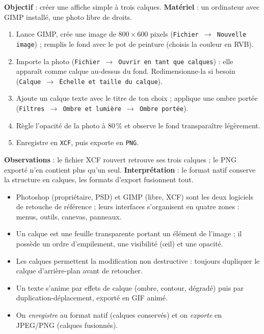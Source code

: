 \documentclass[11pt]{article}
\newcommand{\cle}[1]{{\popxbold\color{popdark}#1}}
\begin{document}
\begin{experience}
\textbf{Objectif} : créer une affiche simple à trois calques. \textbf{Matériel} : un ordinateur avec GIMP installé, une photo libre de droits.
\begin{enumerate}
\item Lance GIMP, crée une image de $800 \times 600$ pixels (\texttt{Fichier $\to$ Nouvelle image}) ; remplis le fond avec le pot de peinture (choisis la couleur en RVB).
\item Importe la photo (\texttt{Fichier $\to$ Ouvrir en tant que calques}) : elle apparaît comme calque au-dessus du fond. Redimensionne-la si besoin (\texttt{Calque $\to$ Échelle et taille du calque}).
\item Ajoute un calque texte avec le titre de ton choix ; applique une ombre portée (\texttt{Filtres $\to$ Ombre et lumière $\to$ Ombre portée}).
\item Règle l'opacité de la photo à $80\,\%$ et observe le fond transparaître légèrement.
\item Enregistre en \texttt{XCF}, puis exporte en \texttt{PNG}.
\end{enumerate}
\textbf{Observations} : le fichier XCF rouvert retrouve ses trois calques ; le PNG exporté n'en contient plus qu'un seul. \textbf{Interprétation} : le format natif conserve la structure en calques, les formats d'export fusionnent tout.
\end{experience}

\begin{aretenir}
\begin{itemize}
\item Photoshop (propriétaire, PSD) et GIMP (libre, XCF) sont les deux logiciels de retouche de référence ; leurs interfaces s'organisent en quatre zones : menus, outils, canevas, panneaux.
\item Un \cle{calque} est une feuille transparente portant un élément de l'image ; il possède un ordre d'empilement, une visibilité (œil) et une opacité.
\item Les calques permettent la \cle{modification non destructive} : toujours dupliquer le calque d'arrière-plan avant de retoucher.
\item Un texte s'anime par effets de calque (ombre, contour, dégradé) puis par duplication-déplacement, exporté en GIF animé.
\item On \emph{enregistre} au format natif (calques conservés) et on \emph{exporte} en JPEG/PNG (calques fusionnés).
\end{itemize}
\end{aretenir}
\end{document}
